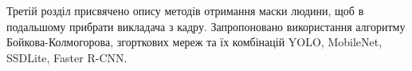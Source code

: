 Третій розділ присвячено опису методів отримання маски людини, 
щоб в подальшому прибрати викладача з кадру. Запропоновано використання
алгоритму Бойкова-Колмогорова, згорткових мереж та їх комбінацій
YOLO, MobileNet, SSDLite, Faster R-CNN.